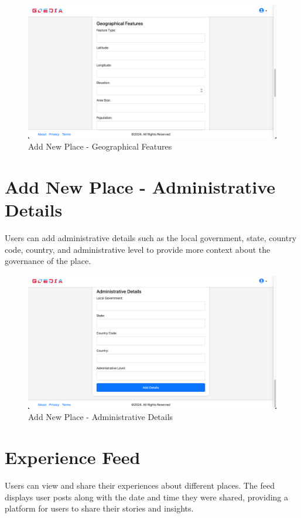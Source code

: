 \begin{figure}[H]
    \centering
    \includegraphics[width=\textwidth]{addnewPlaceGeo.png}
    \caption{Add New Place - Geographical Features}
    \label{fig:addnewPlaceGeo}
\end{figure}

\section{Add New Place - Administrative Details}
Users can add administrative details such as the local government, state, country code, country, and administrative level to provide more context about the governance of the place.

\begin{figure}[H]
    \centering
    \includegraphics[width=\textwidth]{addNewPlaceAdmDetails.png}
    \caption{Add New Place - Administrative Details}
    \label{fig:addNewPlaceAdmDetails}
\end{figure}

\section{Experience Feed}
Users can view and share their experiences about different places. The feed displays user posts along with the date and time they were shared, providing a platform for users to share their stories and insights.

